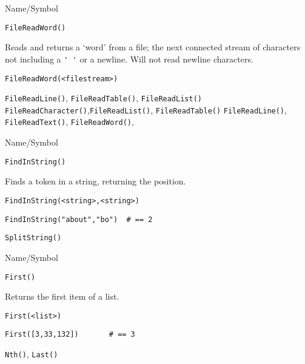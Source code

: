 \begin{desc}{Name/Symbol}
\item[Name/Symbol]	\verb+FileReadWord()+

\item[Description]	Reads and returns  a `word' from a file; the next
		connected stream of characters not including a \verb+' '+
		or a newline. Will not read newline characters.

\item[Usage]
\begin{verbatim}
FileReadWord(<filestream>)
\end{verbatim}

\item[Example]	

\item[See Also]	\verb+FileReadLine()+, \verb+FileReadTable()+, \verb+FileReadList()+
	\verb+FileReadCharacter()+,\verb+FileReadList()+, \verb+FileReadTable()+
	\verb+FileReadLine()+, 	\verb+FileReadText()+, 	\verb+FileReadWord()+,

\end{desc}



\begin{desc}{Name/Symbol}
\item[Name/Symbol]	\verb+FindInString()+

\item[Description]	Finds a token in a string, returning the position.

\item[Usage]
\begin{verbatim}
FindInString(<string>,<string>)
\end{verbatim}

\item[Example]
\begin{verbatim}
FindInString("about","bo") 	# == 2
\end{verbatim}

\item[See Also]	\verb+SplitString()+
\end{desc}



\begin{desc}{Name/Symbol}
\item[Name/Symbol]	\verb+First()+

\item[Description]	Returns the first item of a list.

\item[Usage]
\begin{verbatim}
First(<list>)
\end{verbatim}

\item[Example]
\begin{verbatim}
First([3,33,132])		# == 3
\end{verbatim}

\item[See Also]	\verb+Nth()+, \verb+Last()+
\end{desc}


